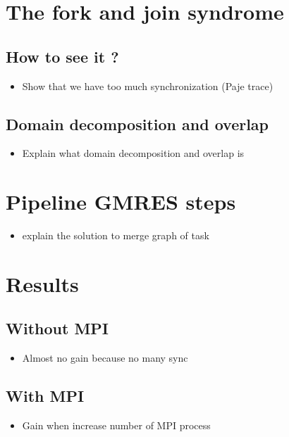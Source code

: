 \documentclass[oneside,12t]{classes/Thesis}
\begin{document}
\section{The fork and join syndrome}
\subsection{How to see it ?}
  \begin{itemize}
    \item Show that we have too much synchronization (Paje trace)
  \end{itemize}
\subsection{Domain decomposition and overlap}
  \begin{itemize}
    \item Explain what domain decomposition and overlap is
  \end{itemize}


\section{Pipeline GMRES steps}
  \begin{itemize}
    \item explain the solution to merge graph of task
  \end{itemize}


\section{Results}
\subsection{Without MPI}
  \begin{itemize}
    \item Almost no gain because no many sync
  \end{itemize}
\subsection{With MPI}
  \begin{itemize}
    \item Gain when increase number of MPI process
  \end{itemize}
\end{document}
